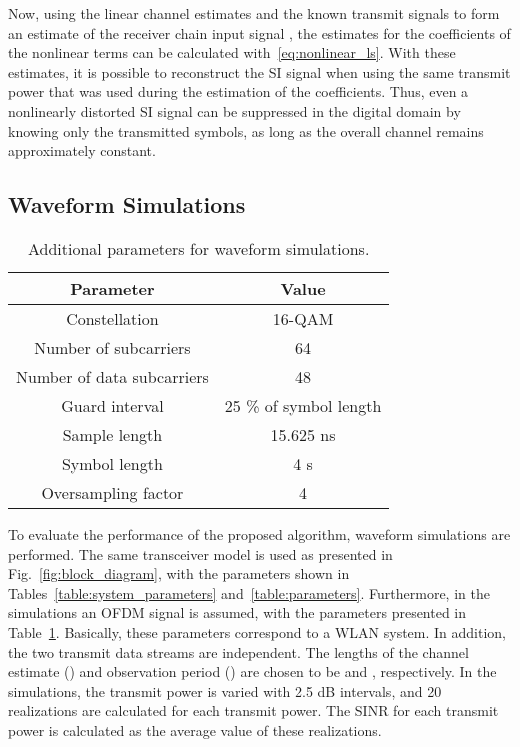 \documentclass[conference,twoside,letterpaper,10pt]{IEEEtran}
\begin{document}
Now, using the linear channel estimates  and the known transmit signals  to form an estimate of the receiver chain input signal , the estimates for the coefficients of the nonlinear terms  can be calculated with~\eqref{eq:nonlinear_ls}. With these estimates, it is possible to reconstruct the SI signal when using the same transmit power that was used during the estimation of the coefficients. Thus, even a nonlinearly distorted SI signal can be suppressed in the digital domain by knowing only the transmitted symbols, as long as the overall channel remains approximately constant.

\subsection{Waveform Simulations}

\begin{table}[!t]
\renewcommand{\arraystretch}{1.3}
\caption{Additional parameters for waveform simulations.}
\label{table:ofdm_param}
\centering
\begin{tabular}{|c||c|}
\hline
\textbf{Parameter} & \textbf{Value}\\
\hline
Constellation & 16-QAM\\
\hline
Number of subcarriers & 64\\
\hline
Number of data subcarriers & 48\\
\hline
Guard interval & 25 \% of symbol length\\
\hline
Sample length & 15.625 ns\\
\hline
Symbol length & 4 s\\ \hline
Oversampling factor & 4\\
\hline
\end{tabular}
\vspace{-4mm}
\end{table}

To evaluate the performance of the proposed algorithm, waveform simulations are performed. The same transceiver model is used as presented in Fig.~\ref{fig:block_diagram}, with the parameters shown in Tables~\ref{table:system_parameters} and~\ref{table:parameters}. Furthermore, in the simulations an OFDM signal is assumed, with the parameters presented in Table~\ref{table:ofdm_param}. Basically, these parameters correspond to a WLAN system. In addition, the two transmit data streams are independent. The lengths of the channel estimate () and observation period () are chosen to be  and , respectively. In the simulations, the transmit power is varied with 2.5 dB intervals, and 20 realizations are calculated for each transmit power. The SINR for each transmit power is calculated as the average value of these realizations.
\end{document}
